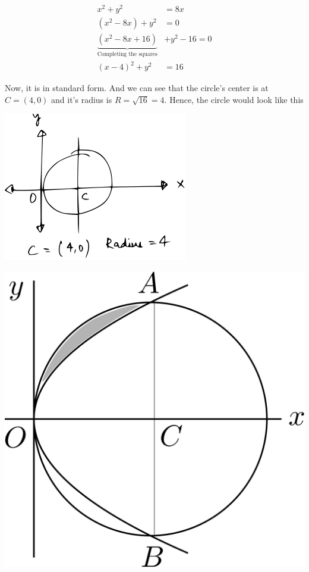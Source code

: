 \documentclass[14pt,fleqn]{extarticle}
\begin{document}
\begin{problem}
\begin{step}
     \begin{align}
x^2 + y^2 &= 8x \\
\left(x^2-8x \right)	 + y^2 &= 0 \\
\underbrace{\left(x^2-8x + 16 \right)}_{\text{Completing the squares}} &+ y^2 - 16 = 0 \\
\left(x-4 \right)^2 + y^2 &= 16 
\end{align}
       
       Now, it is in standard form. And we can see that the circle's center is at $C = \left(4,0 \right)$ and it's radius is $R = \sqrt{16} = 4$. Hence, the circle would look like this 
       
       \begin{center}
\includegraphics[scale=1.2]{1381-A.svg}
\end{center}
\end{step} 

\begin{step}
  \begin{options} 
     \correct 
       
       \begin{center}
\includegraphics[scale=0.2]{1381-C.svg}
\end{center}


\end{options}
\end{step}
\end{problem}
\end{document}
